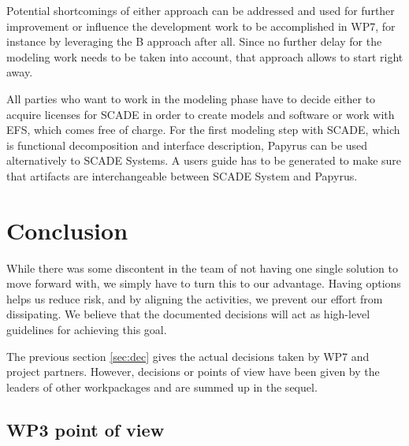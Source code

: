Potential shortcomings of either approach can be addressed and used for further improvement or influence the development work to be accomplished in WP7, for instance by leveraging the B approach after all.  Since no further delay for the modeling work needs to be taken into account, that approach allows to start right away.

All parties who want to work in the modeling phase have to decide either to acquire licenses for SCADE in order to create models and software or work with EFS, which comes free of charge.
For the first modeling step with SCADE, which is functional decomposition and interface description, Papyrus can be used alternatively to SCADE Systems. A users guide has to be generated to make sure that artifacts are interchangeable between SCADE System and Papyrus. 

\section{Conclusion}

While there was some discontent in the team of not having one single solution to move forward with, we simply have to turn this to our advantage.  Having options helps us reduce risk, and by aligning the activities, we prevent our effort from dissipating.  We believe that the documented decisions will act as high-level guidelines for achieving this goal.

The previous section \ref{sec:dec} gives the actual decisions taken by WP7 and project partners.
However, decisions or points of view have been given by the leaders of other workpackages and are summed up in the sequel.

\subsection{WP3 point of view}

